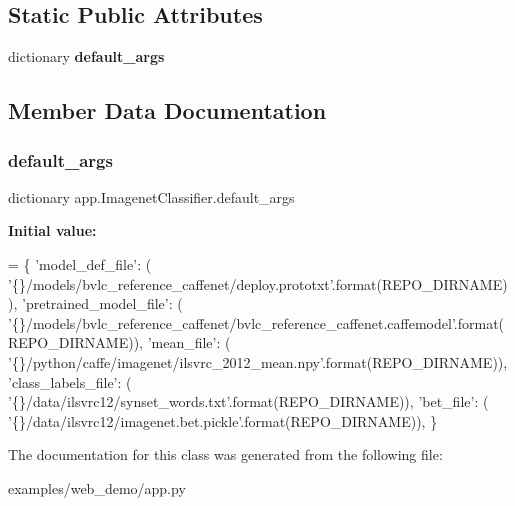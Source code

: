 \subsection*{Static Public Attributes}
\begin{DoxyCompactItemize}
\item 
dictionary {\bfseries default\+\_\+args}
\end{DoxyCompactItemize}


\subsection{Member Data Documentation}
\mbox{\label{classapp_1_1_imagenet_classifier_a7eca03d176ed400d03caafed6a5d4184}} 
\subsubsection{\texorpdfstring{default\+\_\+args}{default\_args}}
{\footnotesize\ttfamily dictionary app.\+Imagenet\+Classifier.\+default\+\_\+args\hspace{0.3cm}{\ttfamily [static]}}

{\bfseries Initial value\+:}
\begin{DoxyCode}
=  \{
        \textcolor{stringliteral}{'model\_def\_file'}: (
            \textcolor{stringliteral}{'\{\}/models/bvlc\_reference\_caffenet/deploy.prototxt'}.format(REPO\_DIRNAME)),
        \textcolor{stringliteral}{'pretrained\_model\_file'}: (
            \textcolor{stringliteral}{'\{\}/models/bvlc\_reference\_caffenet/bvlc\_reference\_caffenet.caffemodel'}.format(REPO\_DIRNAME)),
        \textcolor{stringliteral}{'mean\_file'}: (
            \textcolor{stringliteral}{'\{\}/python/caffe/imagenet/ilsvrc\_2012\_mean.npy'}.format(REPO\_DIRNAME)),
        \textcolor{stringliteral}{'class\_labels\_file'}: (
            \textcolor{stringliteral}{'\{\}/data/ilsvrc12/synset\_words.txt'}.format(REPO\_DIRNAME)),
        \textcolor{stringliteral}{'bet\_file'}: (
            \textcolor{stringliteral}{'\{\}/data/ilsvrc12/imagenet.bet.pickle'}.format(REPO\_DIRNAME)),
    \}
\end{DoxyCode}


The documentation for this class was generated from the following file\+:\begin{DoxyCompactItemize}
\item 
examples/web\+\_\+demo/app.\+py\end{DoxyCompactItemize}
